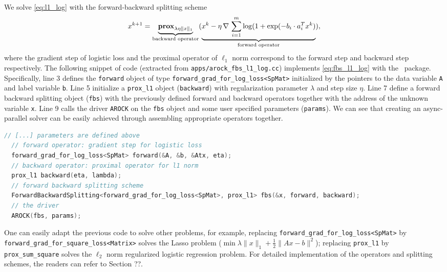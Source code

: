 We solve \eqref{eq:l1_log} with the forward-backward splitting scheme
\begin{equation}\label{eq:fbs_l1_log}
x^{k+1} = \underbrace{\mathbf{prox}_{\lambda \eta \|x\|_1}}_{\text{backward operator}} (\underbrace{x^k - \eta \, \nabla \,\sum_{i = 1}^m \log (1 + \exp(-b_i \cdot a_i^T x^k)}_{\text{forward operator}}),
\end{equation}  
where the gradient step of logistic loss and the proximal operator of $\ell_1$ norm correspond to the
forward step and backward step respectively. The following snippet of code (extracted from 
\texttt{apps/arock\_fbs\_l1\_log.cc}) implements \eqref{eq:fbs_l1_log} with the \pkg~package. 
Specifically, line 3 defines the \texttt{forward} object of type \texttt{forward\_grad\_for\_log\_loss<SpMat>} 
initialized by the pointers to the data variable \texttt{A} and label variable \texttt{b}. Line 5  initialize a 
\texttt{prox\_l1} object (\texttt{backward}) with regularization parameter $\lambda$ and step size $\eta$. 
Line 7 define a forward backward splitting object (\texttt{fbs}) with the previously defined forward and 
backward operators together with the address of the unknown variable \texttt{x}. Line 9 calls the driver 
\texttt{AROCK} on the \texttt{fbs} object and some user specified parameters (\texttt{params}). We can see that creating an async-parallel solver can be 
easily achieved through assembling appropriate operators together.  
\begin{lstlisting}[language=C++]
  // [...] parameters are defined above
  // forward operator: gradient step for logistic loss
  forward_grad_for_log_loss<SpMat> forward(&A, &b, &Atx, eta);
  // backward operator: proximal operator for l1 norm 
  prox_l1 backward(eta, lambda);
  // forward backward splitting scheme
  ForwardBackwardSplitting<forward_grad_for_log_loss<SpMat>, prox_l1> fbs(&x, forward, backward);  
  // the driver
  AROCK(fbs, params);  
\end{lstlisting}
One can easily adapt the previous code to solve other problems, for example, replacing \texttt{forward\_grad\_for\_log\_loss<SpMat>} by \texttt{forward\_grad\_for\_square\_loss<Matrix>} solves the Lasso problem ($\min \lambda \|x\|_1 + \frac{1}{2} \|A x - b\|^2$); replacing \texttt{prox\_l1} by \texttt{prox\_sum\_square} solves the $\ell_2$ norm regularized logistic regression problem. For detailed implementation of the operators and splitting schemes, the readers can refer to Section ??.
